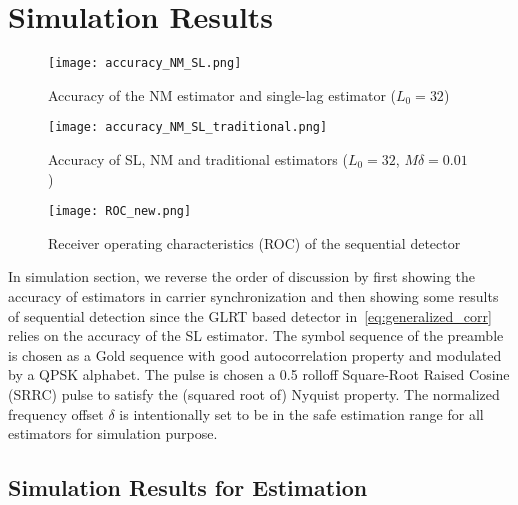 \section{Simulation Results}%
\label{sec:simulations}

\begin{figure}[t]
    \centerline{\texttt{[image: accuracy\_NM\_SL.png]}}
    \caption{Accuracy of the NM estimator and single-lag estimator ($L_0=32$)}
    \label{fig:accuracy_NM_SL}
    \end{figure}

\begin{figure}[t]
    \centerline{\texttt{[image: accuracy\_NM\_SL\_traditional.png]}}
    \caption{Accuracy of SL, NM and traditional estimators ($L_0=32$, $M\delta=0.01$)}
    \label{fig:accuracy_NM_SL_traditional}
    \end{figure}

\begin{figure}[t]
    \centerline{\texttt{[image: ROC\_new.png]}}
    \caption{Receiver operating characteristics (ROC) of the sequential detector}
    \label{fig:Receiver operating characteristics}
    \end{figure}

In simulation section, we reverse the order of discussion by first showing 
the accuracy of estimators in carrier synchronization and then showing some results of sequential detection since
the GLRT based detector in~\eqref{eq:generalized_corr} relies on the accuracy of 
the SL estimator. The symbol sequence of the preamble is chosen as a Gold sequence 
with good autocorrelation property and
modulated by a QPSK alphabet.
The pulse is chosen a 0.5
rolloff Square-Root Raised Cosine (SRRC) pulse to satisfy the (squared root of) Nyquist property.
The normalized frequency offset $\delta$ is intentionally set to be in the safe estimation range for all estimators for simulation purpose.

\subsection{Simulation Results for Estimation}


